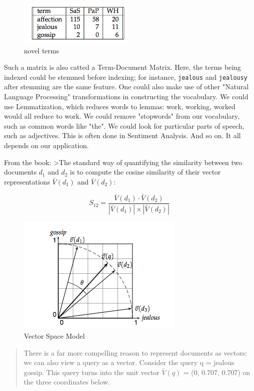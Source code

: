 \documentclass[11pt]{article}
\makeatletter
\def\maxwidth{\ifdim\Gin@nat@width>\linewidth\linewidth
    \else\Gin@nat@width\fi}
\let\Oldincludegraphics\includegraphics
\renewcommand{\includegraphics}[1]{\Oldincludegraphics[width=.8\maxwidth]{#1}}
\makeatother
\begin{document}
\begin{figure}
\centering
\includegraphics{terms.png}
\caption{novel terms}
\end{figure}

Such a matrix is also catted a Term-Document Matrix. Here, the terms
being indexed could be stemmed before indexing; for instance,
\texttt{jealous} and \texttt{jealousy} after stemming are the same
feature. One could also make use of other "Natural Language Processing"
transformations in constructing the vocabulary. We could use
Lemmatization, which reduces words to lemmas: work, working, worked
would all reduce to work. We could remove "stopwords" from our
vocabulary, such as common words like "the". We could look for
particular parts of speech, such as adjectives. This is often done in
Sentiment Analysis. And so on. It all depends on our application.

From the book: \textgreater{}The standard way of quantifying the
similarity between two documents \(d_1\) and \(d_2\) is to compute the
cosine similarity of their vector representations \(\bar V(d_1)\) and
\(\bar V(d_2)\):

\[S_{12} = \frac{\bar V(d_1) \cdot \bar V(d_2)}{|\bar V(d_1)| \times |\bar V(d_2)|}\]

\begin{figure}
\centering
\includegraphics{vsm.png}
\caption{Vector Space Model}
\end{figure}

\begin{quote}
There is a far more compelling reason to represent documents as vectors:
we can also view a query as a vector. Consider the query q = jealous
gossip. This query turns into the unit vector \(\bar V(q)\) = (0, 0.707,
0.707) on the three coordinates below.
\end{quote}
\end{document}

